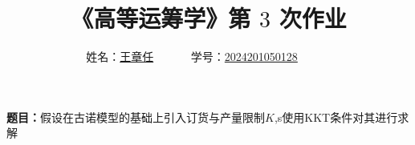 \documentclass[10pt,a4paper]{article}
\begin{document}
\title{
{\heiti《高等运筹学》第 {$3$} 次作业
}
}
\date{}

\author{
	姓名：\underline{王章任}~~~~~~
	学号：\underline{2024201050128}~~~~~~}

\maketitle

\noindent
\section*{\heiti \color{red}{古诺模型拓展}}
\noindent
{\bf 题目：}假设在古诺模型的基础上引入订货与产量限制$K$,s使用KKT条件对其进行求解
\end{document}
